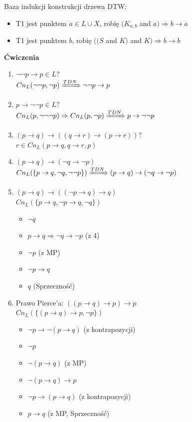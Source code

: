 \documentclass[10pt,a4paper]{article}
\theoremstyle{plain}
\theoremstyle{definition}
\newcommand{\header}[1]{\noindent\textbf{#1}}
\begin{document}
Baza indukcji konstrukcji drzewa DTW:
\begin{itemize}
\item T1 jest punktem $a \in L \cup X$, robię $(K_{a, b}$ and $a) \Rightarrow b \rightarrow a$
\item T1 jest punktem $b$, robię $((S$ and $K)$ and $K) \Rightarrow b \rightarrow b$
\end{itemize}

\newpage

\header{Ćwiczenia}
\begin{enumerate}
\item $\neg \neg p \rightarrow p \in L$?\\
$Cn_{L}(\neg \neg p, \neg p) \xRightarrow{TDN} \neg \neg p \rightarrow p$
\item $p \rightarrow \neg \neg p \in L?$\\
$Cn_{L}(p, \neg \neg \neg p) \Rightarrow Cn_{L}(p, \neg p) \xRightarrow{TDN} p \rightarrow \neg \neg p$
\item $(p \rightarrow q) \rightarrow ((q \rightarrow r) \rightarrow (p \rightarrow r))$?\\
$r \in Cn_{L}({p \rightarrow q, q \rightarrow r, p})$
\item $(p \rightarrow q) \rightarrow (\neg q \rightarrow \neg p)$\\
$Cn_{L}(\{p \rightarrow q, \neg q, \neg \neg p\}) \xRightarrow{TDN} (p \rightarrow q) \rightarrow (\neg q \rightarrow \neg p)$
\item $(p \rightarrow q) \rightarrow ((\neg p \rightarrow q) \rightarrow q)$\\
$Cn_{L}(\{p \rightarrow q, \neg p \rightarrow q, \neg q\})$
\begin{itemize}
\item $\neg q$
\item $p \rightarrow q \Rightarrow \neg q \rightarrow \neg p$ (z 4)
\item $\neg p$ (z MP)
\item $\neg p \rightarrow q$
\item $q$ (Sprzeczność)
\end{itemize}
\item Prawo Pierce'a: $((p \rightarrow q) \rightarrow p) \rightarrow p$\\
$Cn_{L}(\{(p \rightarrow q) \rightarrow p, \neg p\})$
\begin{itemize}
\item $\neg p \rightarrow \neg (p \rightarrow q)$ (z kontrapozycji)
\item $\neg p$
\item $\neg (p \rightarrow q)$ (z MP)
\item $\neg (p \rightarrow q) \rightarrow p$
\item $\neg p \rightarrow (p \rightarrow q)$ (z kontrapozycji)
\item $p \rightarrow q$ (z MP, Sprzeczność)
\end{itemize}
\end{enumerate}
\end{document}
